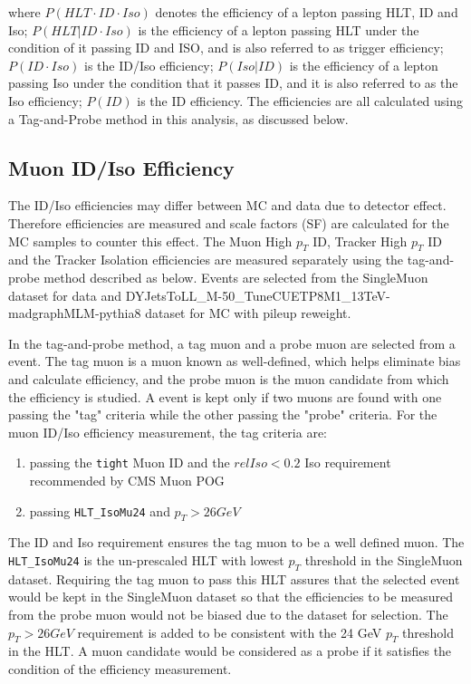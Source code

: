where $P(HLT\cdot ID\cdot Iso)$ denotes the efficiency of a lepton passing HLT, ID and Iso; $P(HLT|ID\cdot Iso)$ is the efficiency of a lepton passing HLT under the condition of it passing ID and ISO, and is also referred to as trigger efficiency; $P(ID\cdot Iso)$ is the ID/Iso efficiency; $P(Iso|ID)$ is the efficiency of a lepton passing Iso under the condition that it passes ID, and it is also referred to as the Iso efficiency; $P(ID)$ is the ID efficiency. The efficiencies are all calculated using a Tag-and-Probe method in this analysis, as discussed below. 

\subsection{Muon ID/Iso Efficiency}
The ID/Iso efficiencies may differ between MC and data due to detector effect. Therefore efficiencies are measured and scale factors (SF) are calculated for the MC samples to counter this effect. The Muon High $p_T$ ID, Tracker High $p_T$ ID and the Tracker Isolation efficiencies are measured separately using the tag-and-probe method described as below. Events are selected from the SingleMuon dataset for data and DYJetsToLL\_M-50\_TuneCUETP8M1\_13TeV-madgraphMLM-pythia8 dataset for MC with pileup reweight. 

\vspace{0.3cm}
In the tag-and-probe method, a tag muon and a probe muon are selected from a event. The tag muon is a muon known as well-defined, which helps eliminate bias and calculate efficiency, and the probe muon is the muon candidate from which the efficiency is studied. A event is kept only if two muons are found with one passing the "tag" criteria while the other passing the "probe" criteria. For the muon ID/Iso efficiency measurement, the tag criteria are:
\begin{enumerate}
\item passing the \texttt{tight} Muon ID and the $relIso<0.2$ Iso requirement recommended by CMS Muon POG
\item passing \texttt{HLT\_IsoMu24} and $p_T > 26 GeV$
\end{enumerate}

The ID and Iso requirement ensures the tag muon to be a well defined muon. The \texttt{HLT\_IsoMu24} is the un-prescaled HLT with lowest $p_T$ threshold in the SingleMuon dataset. Requiring the tag muon to pass this HLT assures that the selected event would be kept in the SingleMuon dataset so that the efficiencies to be measured from the probe muon would not be biased due to the dataset for selection. The $p_T > 26 GeV$ requirement is added to be consistent with the 24 GeV $p_T$ threshold in the HLT. A muon candidate would be considered as a probe if it satisfies the condition of the efficiency measurement. 

